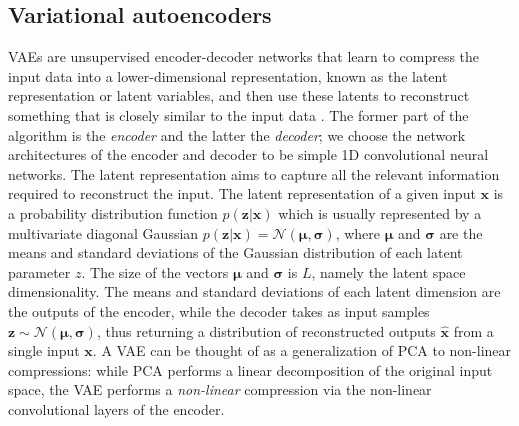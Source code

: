 \documentclass[aps, prd, reprint, superscriptaddress, nofootinbib, bibnotes]{revtex4-2}
\begin{document}
\subsection{Variational autoencoders} 
VAEs are unsupervised encoder-decoder networks that learn to compress the input data into a lower-dimensional representation, known as the latent representation or latent variables, and then use these latents to reconstruct something that is closely similar to the input data \cite{Hinton1993, KingmaWelling2013, Rezende2014}. The former part of the algorithm is the \textit{encoder} and the latter the \textit{decoder}; we choose the network architectures of the encoder and decoder to be simple 1D convolutional neural networks. The latent representation aims to capture all the relevant information required to reconstruct the input. The latent representation of a given input $\bm{x}$ is a probability distribution function $p(\bm{z} | \bm{x})$ which is usually represented by a multivariate diagonal Gaussian $p(\bm{z} | \bm{x}) = \mathcal{N} (\bm{\mu}, \bm{\sigma})$, where $\bm{\mu}$ and $\bm{\sigma}$ are the means and standard deviations of the Gaussian distribution of each latent parameter $z$. The size of the vectors $\bm{\mu}$ and $\bm{\sigma}$ is $L$, namely the latent space dimensionality. The means and standard deviations of each latent dimension are the outputs of the encoder, while the decoder takes as input samples $\bm{z} \sim \mathcal{N} (\bm{\mu}, \bm{\sigma})$, thus returning a distribution of reconstructed outputs $\bm{\hat{x}}$ from a single input $\bm{x}$. A VAE can be thought of as a generalization of PCA to non-linear compressions: while PCA performs a linear decomposition of the original input space, the VAE performs a \textit{non-linear} compression via the non-linear convolutional layers of the encoder.
\end{document}
